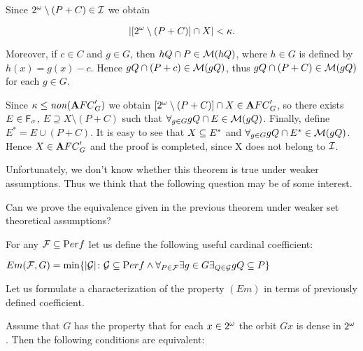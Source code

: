 Since $2^{\omega} \setminus (P + C) \in {\cal I}$ we obtain

\[ | [ 2^{\omega} \setminus (P + C) ] \cap X | < \kappa. \]

Moreover, if $c \in C$ and $g \in G$, then
$hQ \cap P \in {\cal M}(hQ)$,
where $h \in G$ is defined by $h(x) = g(x) - c$.
  Hence $gQ \cap (P + c) \in {\cal M}(gQ)$,
thus
  $gQ \cap (P + C) \in {\cal M}(gQ)$ for each $g \in G$.

  Since $\kappa \leq {\it non}({\mathbf AFC}^\prime_{G})$ we obtain
$[ 2^{\omega} \setminus (P+C)] \cap X \in {\mathbf AFC}^\prime_{G}$,
so there exists $E \in {\sf F}_{\sigma}$,
$E \supseteq X \setminus (P + C)$ such that
$\forall_{g \in G} gQ \cap E \in {\cal M}(gQ)$.
  Finally, define $E^* = E \cup (P + C)$.
It is easy to see that $X \subseteq E^*$ and
$\forall_{g \in G} gQ \cap E^* \in {\cal M}(gQ)$.
  Hence $X \in {\mathbf AFC}^\prime_{G}$ and the proof is
completed, since X does not belong to ${\cal I}$.
\medskip

  Unfortunately, we don't know whether this
theorem is true under weaker assumptions.
  Thus we think that the following question may be of
some interest.

\begin{question}
Can we prove the equivalence given in the previous theorem
under weaker set theoretical assumptions?
\end{question}


  For any ${\mathcal{F}} \subseteq {\mathrm Perf}$ 
let us define the following useful cardinal coefficient:
\begin{definition}
$Em({\mathcal{F}}, G) = \min\{|{\cal G}|\colon {\cal G}\subseteq {\mathrm Perf} \wedge 
\forall_{P\in{\mathcal{F}}} \exists{g\in G} \exists_{Q\in{\cal G}} gQ \subseteq P\}$
\end{definition}

  Let us formulate a characterization of the property 
$(Em)$ in terms of previously defined coefficient.

Assume that $G$ has the property that for each $x\in2^{\omega}$
the orbit $Gx$ is dense in $2^{\omega}$.
Then the following conditions are equivalent:

